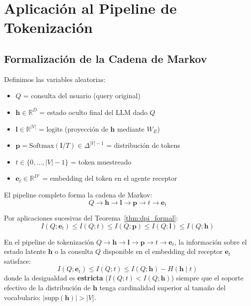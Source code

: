 \section{Aplicación al Pipeline de Tokenización}

\subsection{Formalización de la Cadena de Markov}

Definimos las variables aleatorias:
\begin{itemize}
\item $Q$ = consulta del usuario (query original)
\item $\mathbf{h} \in \mathbb{R}^D$ = estado oculto final del LLM dado $Q$
\item $\mathbf{l} \in \mathbb{R}^{|V|}$ = logits (proyección de $\mathbf{h}$ mediante $W_E$)
\item $\mathbf{p} = \text{Softmax}(\mathbf{l}/T) \in \Delta^{|V|-1}$ = distribución de tokens
\item $t \in \{0,\ldots,|V|-1\}$ = token muestreado
\item $\mathbf{e}_t \in \mathbb{R}^{D'}$ = embedding del token en el agente receptor
\end{itemize}

El pipeline completo forma la cadena de Markov:
\begin{equation}
Q \to \mathbf{h} \to \mathbf{l} \to \mathbf{p} \to t \to \mathbf{e}_t
\end{equation}

Por aplicaciones sucesivas del Teorema~\ref{thm:dpi_formal}:
\begin{equation}
I(Q; \mathbf{e}_t) \le I(Q; t) \le I(Q; \mathbf{p}) \le I(Q; \mathbf{l}) \le I(Q; \mathbf{h})

\end{equation}

\begin{corollary}

En el pipeline de tokenización $Q \to \mathbf{h} \to \mathbf{l} \to \mathbf{p} \to t \to \mathbf{e}_t$,
la información sobre el estado latente $\mathbf{h}$ o la consulta $Q$ disponible
en el embedding del receptor $\mathbf{e}_t$ satisface:
\begin{equation}
I(Q; \mathbf{e}_t) \le I(Q; t) \le I(Q; \mathbf{h}) - H(\mathbf{h} \mid t)
\end{equation}
donde la desigualdad es \textbf{estricta} ($I(Q; t) < I(Q; \mathbf{h})$) siempre que 
el soporte efectivo de la distribución de $\mathbf{h}$ tenga cardinalidad 
superior al tamaño del vocabulario: $|\text{supp}(\mathbf{h})| > |V|$.
\end{corollary}

